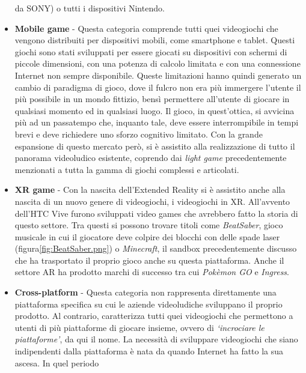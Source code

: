 \begin{itemize}
                    da SONY) o tutti i dispositivi Nintendo. 
                \item \textbf{Mobile game} - Questa categoria comprende tutti quei videogiochi che vengono distribuiti per dispositivi mobili, come smartphone e tablet. Questi giochi
                    sono stati sviluppati per essere giocati su dispositivi con schermi di piccole dimensioni, con una potenza di calcolo limitata e con una connessione Internet
                    non sempre disponibile. Queste limitazioni hanno quindi generato un cambio di paradigma di gioco, dove il fulcro non era più immergere l'utente il più possibile
                    in un mondo fittizio, bensì permettere all'utente di giocare in qualsiasi momento ed in qualsiasi luogo. Il gioco, in quest'ottica, si avvicina più ad un passatempo
                    che, inquanto tale, deve essere interrompibile in tempi brevi e deve richiedere uno sforzo cognitivo limitato. Con la grande espansione di questo mercato però, si è
                    assistito alla realizzazione di tutto il panorama videoludico esistente, coprendo dai \textit{light game} precedentemente menzionati a tutta la gamma di giochi 
                    complessi e articolati.
                \item \textbf{XR game} - Con la nascita dell'Extended Reality si è assistito anche alla nascita di un nuovo genere di videogiochi, i videogiochi in XR. All'avvento
                    dell'HTC Vive furono sviluppati video games che avrebbero fatto la storia di questo settore. Tra questi si possono trovare titoli come \textit{BeatSaber}, gioco
                    musicale in cui il giocatore deve colpire dei blocchi con delle spade laser (figura\ref{fig:BeatSaber.png}) o \textit{Minecraft}, il sandbox precedentemente 
                    discusso che ha trasportato il proprio gioco anche su questa piattaforma. Anche il settore AR ha prodotto marchi di successo tra cui \textit{Pokèmon GO} e 
                    \textit{Ingress}.
                \item \textbf{Cross-platform} - Questa categoria non rappresenta direttamente una piattaforma specifica su cui le aziende videoludiche sviluppano il proprio prodotto.
                    Al contrario, caratterizza tutti quei videogiochi che permettono a utenti di più piattaforme di giocare insieme, ovvero di \textit{`incrociare le piattaforme'}, da qui
                    il nome. La necessità di sviluppare videogiochi che siano indipendenti dalla piattaforma è nata da quando Internet ha fatto la sua ascesa. In quel periodo

\end{itemize}
